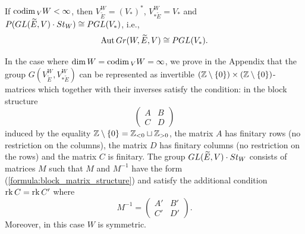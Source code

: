 \documentclass[11pt, a4paper]{article}
\begin{document}
If $\mathrm{codim}\,_V W<\infty$, then $V^W_{\widetilde{E}}=(V_*)^*$, $V^W_{*\widetilde{E}}=V_*$ and  $P(GL(\widetilde{E},V) \cdot St_W)\cong P GL(V_*)$, i.e.,
\begin{equation*}
    \mathrm{Aut}\,Gr(W,\widetilde{E},V)\cong P GL(V_*).
\end{equation*}


In the case where $\dim W=\mathrm{codim}\,_V W=\infty$, we prove in the Appendix that the group $G(V^W_{\widetilde{E}},V^W_{*\widetilde{E}})$ can be represented as invertible $(\mathbb{Z}\setminus\{0\})\times(\mathbb{Z}\setminus\{0\})$-matrices which together with their inverses satisfy the condition: in the block structure 
\begin{equation}\label{formula:block_matrix_structure}
    \left(\begin{array}{c|c}
A & B \\
\hline
C & D  \end{array}\right)
\end{equation}
induced by the equality $\mathbb{Z}\setminus\{0\}=\mathbb{Z}_{<0}\sqcup\mathbb{Z}_{>0}$, the matrix $A$ has finitary rows (no restriction on the columns), the matrix $D$ has finitary columns (no restriction on the rows) and the matrix $C$ is finitary. %
 The group $GL(\widetilde{E},V) \cdot St_W$ consists of matrices $M$ such that $M$ and $M^{-1}$ have the form (\ref{formula:block_matrix_structure}) and satisfy the additional condition $\mathrm{rk}\, C=\mathrm{rk}\, C'$ where \begin{equation*}
M^{-1}=\left(\begin{array}{c|c}
A' & B' \\
\hline
C' & D' \end{array}\right).
\end{equation*}  Moreover, in this case $W$ is symmetric.  %

\end{document}
